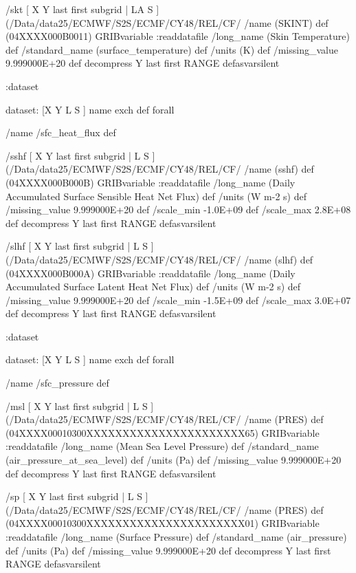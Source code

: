 \begin{ingrid}
/skt { [ X Y last first subgrid | LA S ] (/Data/data25/ECMWF/S2S/ECMF/CY48/REL/CF/%
/name (SKINT) def
(04XXXX000B0011) GRIBvariable
:readdatafile
/long_name (Skin Temperature) def
/standard_name (surface_temperature) def
/units (K) def
/missing_value 9.999000E+20 def
decompress
Y last first RANGE
} defasvarsilent

:dataset

dataset:
[X Y L S ] {name exch def } forall

/name /sfc_heat_flux def

/sshf { [ X Y last first subgrid | L S ] (/Data/data25/ECMWF/S2S/ECMF/CY48/REL/CF/%
/name (sshf) def
(04XXXX000B000B) GRIBvariable
:readdatafile
/long_name (Daily Accumulated Surface Sensible Heat Net Flux) def
/units (W m-2 s) def
/missing_value 9.999000E+20 def
/scale_min -1.0E+09 def
/scale_max 2.8E+08 def
decompress
Y last first RANGE
} defasvarsilent

/slhf { [ X Y last first subgrid | L S ] (/Data/data25/ECMWF/S2S/ECMF/CY48/REL/CF/%
/name (slhf) def
(04XXXX000B000A) GRIBvariable
:readdatafile
/long_name (Daily Accumulated Surface Latent Heat Net Flux) def
/units (W m-2 s) def
/missing_value 9.999000E+20 def
/scale_min -1.5E+09 def
/scale_max 3.0E+07 def
decompress
Y last first RANGE
} defasvarsilent

:dataset

dataset:
[X Y L S ] {name exch def } forall

/name /sfc_pressure def

/msl { [ X Y last first subgrid | L S ] (/Data/data25/ECMWF/S2S/ECMF/CY48/REL/CF/%
/name (PRES) def
(04XXXX00010300XXXXXXXXXXXXXXXXXXXXXX65) GRIBvariable
:readdatafile
/long_name (Mean Sea Level Pressure) def
/standard_name (air_pressure_at_sea_level) def
/units (Pa) def
/missing_value 9.999000E+20 def
decompress
Y last first RANGE
} defasvarsilent

/sp { [ X Y last first subgrid | L S ] (/Data/data25/ECMWF/S2S/ECMF/CY48/REL/CF/%
/name (PRES) def
(04XXXX00010300XXXXXXXXXXXXXXXXXXXXXX01) GRIBvariable
:readdatafile
/long_name (Surface Pressure) def
/standard_name (air_pressure) def
/units (Pa) def
/missing_value 9.999000E+20 def
decompress
Y last first RANGE
} defasvarsilent


\end{ingrid}
